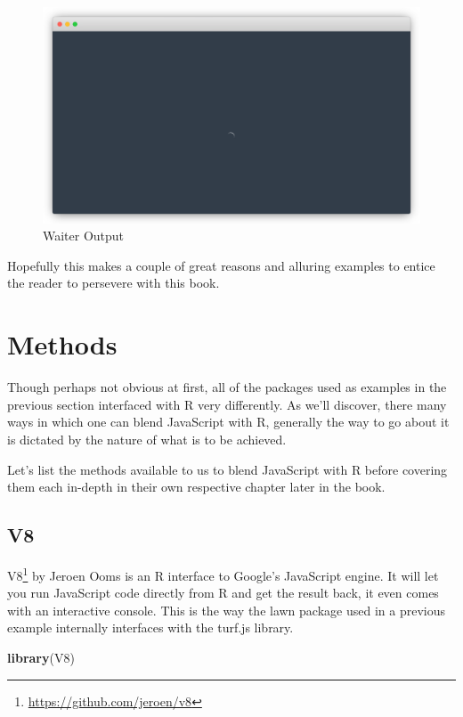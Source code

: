 \documentclass[
]{krantz}
\makeatletter
\newenvironment{Shaded}{\begin{snugshade}}{\end{snugshade}}
\newcommand{\KeywordTok}[1]{\textcolor[rgb]{0.27,0.27,0.27}{\textbf{#1}}}
\newcommand{\NormalTok}[1]{#1}
\renewcommand{\href}[2]{#2\footnote{\url{#1}}}
\newenvironment{kframe}{%
\medskip{}
\setlength{\fboxsep}{.8em}
 \def\at@end@of@kframe{}%
 \ifinner\ifhmode%
  \def\at@end@of@kframe{\end{minipage}}%
  \begin{minipage}{\columnwidth}%
 \fi\fi%
 \def\FrameCommand##1{\hskip\@totalleftmargin \hskip-\fboxsep
 \colorbox{shadecolor}{##1}\hskip-\fboxsep
     \hskip-\linewidth \hskip-\@totalleftmargin \hskip\columnwidth}%
 \MakeFramed {\advance\hsize-\width
   \@totalleftmargin\z@ \linewidth\hsize
   \@setminipage}}%
 {\par\unskip\endMakeFramed%
 \at@end@of@kframe}
\renewenvironment{Shaded}{\begin{kframe}}{\end{kframe}}
\makeatother
\begin{document}
\begin{figure}
\centering
\includegraphics{images/waiter.png}
\caption{Waiter Output}
\end{figure}

Hopefully this makes a couple of great reasons and alluring examples to entice the reader to persevere with this book.

\hypertarget{intro-methods}{%
\section{Methods}\label{intro-methods}}

Though perhaps not obvious at first, all of the packages used as examples in the previous section interfaced with R very differently. As we'll discover, there many ways in which one can blend JavaScript with R, generally the way to go about it is dictated by the nature of what is to be achieved.

Let's list the methods available to us to blend JavaScript with R before covering them each in-depth in their own respective chapter later in the book.

\hypertarget{intro-v8}{%
\subsection{V8}\label{intro-v8}}

\href{https://github.com/jeroen/v8}{V8} by Jeroen Ooms is an R interface to Google's JavaScript engine. It will let you run JavaScript code directly from R and get the result back, it even comes with an interactive console. This is the way the lawn package used in a previous example internally interfaces with the turf.js library.

\begin{Shaded}
\begin{Highlighting}[]
\KeywordTok{library}\NormalTok{(V8)}
\end{Highlighting}
\end{Shaded}
\end{document}
